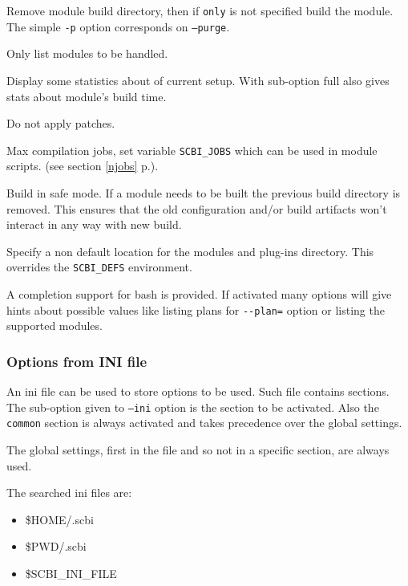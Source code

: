 \documentclass[a4paper,12pt,twoside]{article}
\newcommand{\code}[1]{\texttt{#1}}
\newcommand{\seeref}[1]{see section \ref{#1} p.\pageref{#1}}
\newcommand{\ddash}{-{}-}
\begin{document}
\begin{description}[font=\texttt]
	\item[-p | \ddash{}purge{[:only]}] Remove module build directory, then if \code{only} is not specified build the module. The simple \code{-p} option corresponds on \code{--purge}.

	\item[\ddash{}dry-run] Only list modules to be handled.

	\item[\ddash{}stat:{[}full{]}] Display some statistics about of current setup. With sub-option full also gives stats about module's build time.

	\item[-n | \ddash{}no-patch] Do not apply patches.

	\item[-j | \ddash{}jobs=<n>] Max compilation jobs, set variable \code{SCBI\_JOBS} which can be used in module scripts. (\seeref{njobs}).

	\item[\ddash{}safe] Build in safe mode. If a module needs to be built the previous build directory is removed. This ensures that the old configuration and/or build artifacts won't interact in any way with new build.

	\item[\ddash{}plugins=<directory>] Specify a non default location for the modules and plug-ins directory. This overrides the \code{SCBI\_DEFS} environment.
\end{description}

A completion support for bash is provided. If activated many options will give hints about possible values like listing plans for \code{\ddash{}plan=} option or listing the supported modules.

\subsubsection{Options from INI file}
\label{inifile}

An ini file can be used to store options to be used. Such file contains sections. The sub-option given to \code{--ini} option is the section to be activated. Also the \code{common} section is always activated and takes precedence over the global settings.

The global settings, first in the file and so not in a specific section, are always used.

The searched ini files are:

\begin{itemize}
	\item \$HOME/.scbi
	\item \$PWD/.scbi
	\item \$SCBI\_INI\_FILE
\end{itemize}
\end{document}
